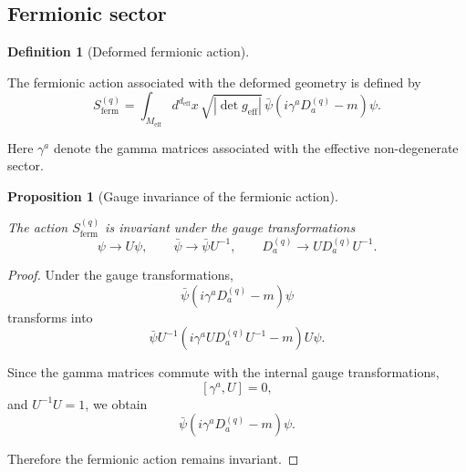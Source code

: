 \documentclass[12pt,a4paper]{article}
\theoremstyle{plain}
\newtheorem{proposition}[theorem]{Proposition}
\theoremstyle{definition}
\newtheorem{definition}[theorem]{Definition}
\begin{document}
\subsection{Fermionic sector}

\begin{definition}[Deformed fermionic action]
\label{def:fermion_action}

The fermionic action associated with the deformed geometry is defined by
\begin{equation}
\label{eq:fermion_action}
S_{\mathrm{ferm}}^{(q)}
=
\int_{M_{\mathrm{eff}}}
d^{d_{\mathrm{eff}}}x\,
\sqrt{
\left|
\det g_{\mathrm{eff}}
\right|
}
\,
\bar{\psi}
\left(
i\gamma^a D_a^{(q)}
-
m
\right)
\psi.
\end{equation}

Here \(\gamma^a\) denote the gamma matrices associated with the effective non-degenerate sector.

\end{definition}

\begin{proposition}[Gauge invariance of the fermionic action]
\label{prop:fermion_gauge_invariance}

The action \(S_{\mathrm{ferm}}^{(q)}\) is invariant under the gauge transformations
\begin{equation}
\psi\to U\psi,
\qquad
\bar{\psi}\to\bar{\psi}U^{-1},
\qquad
D_a^{(q)}
\to
U D_a^{(q)} U^{-1}.
\label{eq:gauge_transform_fermion}
\end{equation}

\end{proposition}

\begin{proof}

Under the gauge transformations,
\[
\bar{\psi}
\left(
i\gamma^a D_a^{(q)}-m
\right)
\psi
\]
transforms into
\[
\bar{\psi}
U^{-1}
\left(
i\gamma^a U D_a^{(q)} U^{-1}-m
\right)
U\psi.
\]

Since the gamma matrices commute with the internal gauge transformations,
\[
[\gamma^a,U]=0,
\]
and \(U^{-1}U=1\), we obtain
\[
\bar{\psi}
\left(
i\gamma^a D_a^{(q)}-m
\right)
\psi.
\]

Therefore the fermionic action remains invariant.

\end{proof}

\end{document}

